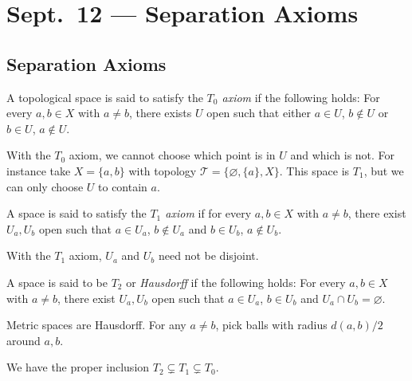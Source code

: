 \chapter{Sept.~12 --- Separation Axioms}

\section{Separation Axioms}
\begin{definition}
  A topological space is said to satisfy the
  \emph{$T_0$ axiom} if the following holds:
  For every $a, b \in X$ with $a \ne b$, there exists
  $U$ open such that either $a \in U$, $b \notin U$
  or $b \in U$, $a \notin U$.
\end{definition}

\begin{remark}
  With the $T_0$ axiom, we cannot choose which
  point is in $U$ and which is not.
  For instance take $X = \{a, b\}$ with topology
  $\mathcal{T} = \{\varnothing, \{a\}, X\}$.
  This space is $T_1$, but we can only choose
  $U$ to contain $a$.
\end{remark}

\begin{definition}
  A space is said to satisfy the \emph{$T_1$ axiom}
  if for every $a, b \in X$ with $a \ne b$,
  there exist $U_a, U_b$ open such that
  $a \in U_a$, $b \notin U_a$ and
  $b \in U_b$, $a \notin U_b$.
\end{definition}

\begin{remark}
  With the $T_1$ axiom, $U_a$ and $U_b$
  need not be disjoint.
\end{remark}

\begin{definition}
  A space is said to be $T_2$ or \emph{Hausdorff}
  if the following holds: For every $a, b \in X$
  with $a \ne b$, there exist $U_a, U_b$ open
  such that $a \in U_a$, $b \in U_b$ and
  $U_a \cap U_b = \varnothing$.
\end{definition}

\begin{example}
  Metric spaces are Hausdorff. For any $a \ne b$,
  pick balls with radius $d(a, b) / 2$ around $a, b$.
\end{example}

\begin{theorem}
  We have the proper inclusion
  $T_2 \subsetneq T_1 \subsetneq T_0$.
\end{theorem}

